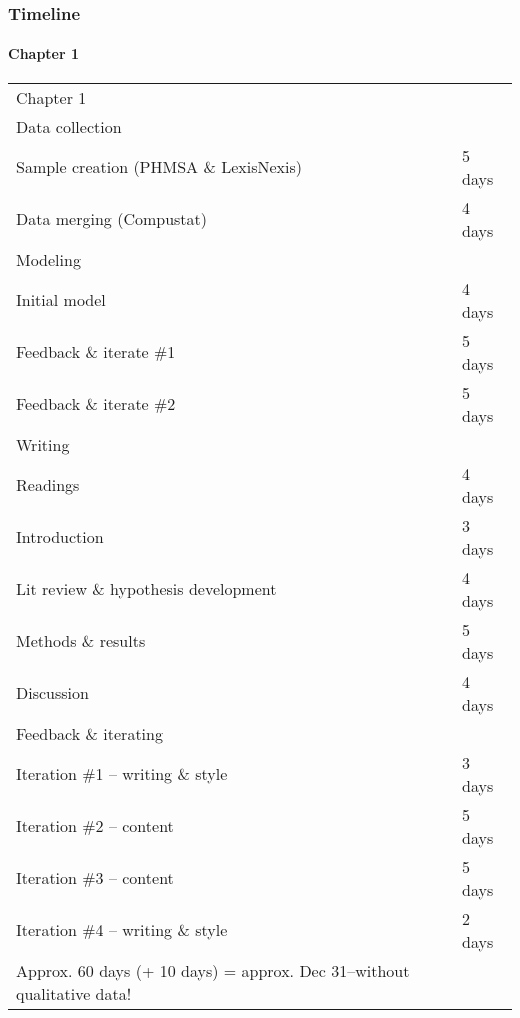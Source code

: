 \begin{frame}
	\frametitle{Timeline}
	\framesubtitle{Chapter 1}
	\tiny
	\begin{tabular}{ l l }
		Chapter 1 & \\
		Data collection	& \\
		\tabindent Sample creation (PHMSA \& LexisNexis)	& 5 days\\
		\tabindent Data merging (Compustat)					& 4 days\\
		Modeling											& \\
		\tabindent Initial model							& 4 days\\
		\tabindent Feedback \& iterate \#1					& 5 days\\
		\tabindent Feedback \& iterate \#2					& 5 days\\
		Writing												& \\
		\tabindent Readings									& 4 days\\
		\tabindent Introduction								& 3 days\\
		\tabindent Lit review \& hypothesis development		& 4 days\\
		\tabindent Methods \& results						& 5 days\\
		\tabindent Discussion								& 4 days\\
		Feedback \& iterating								& \\
		\tabindent Iteration \#1 -- writing \& style		& 3 days\\
		\tabindent Iteration \#2 -- content					& 5 days\\
		\tabindent Iteration \#3 -- content					& 5 days\\
		\tabindent Iteration \#4 -- writing \& style		& 2 days\\
		\hline
		Approx. 60 days (+ 10 days) = approx. Dec 31--without qualitative data!
	\end{tabular}
\end{frame}


